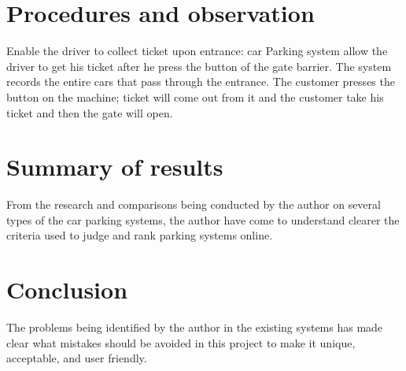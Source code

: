 \documentclass{article}
\begin{document}
\section{Procedures and observation}
   Enable the driver to collect ticket upon entrance: car Parking system allow the driver to get his ticket after he press the button of the gate barrier.
The system records the entire cars that pass through the entrance.
The customer presses the button on the machine; ticket will come out from it and the customer take his ticket and then the gate will open.

\section{Summary of results}
     From the research and comparisons being conducted by the author on several types of the car parking systems, the author have come to understand clearer the criteria used to judge and rank parking systems online.

\section{Conclusion}
   The problems being identified by the author in the existing systems has made clear what mistakes should be avoided in this project to make it unique, acceptable, and user friendly.
\end{document}
